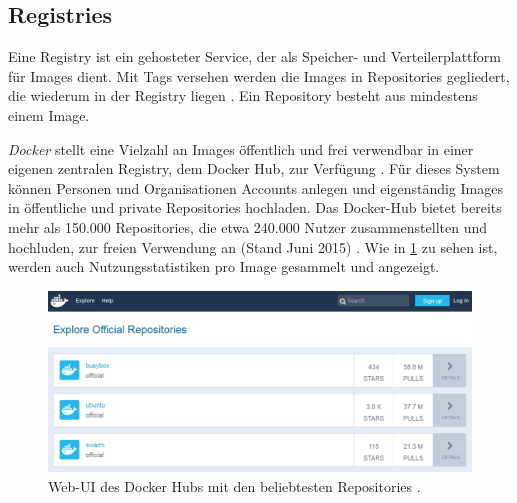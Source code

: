 \documentclass[../main.tex]{subfiles}
\begin{document}

		\subsection{Registries}
		\label{dockerRegistries}
      Eine Registry ist ein gehosteter Service, der als Speicher- und Verteilerplattform für Images dient. Mit Tags versehen werden die Images in Repositories gegliedert, die wiederum in der Registry liegen \cite{dockerRegistry}. Ein Repository besteht aus mindestens einem Image.

      \emph{Docker} stellt eine Vielzahl an Images öffentlich und frei verwendbar in einer eigenen zentralen Registry, dem Docker Hub, zur Verfügung \cite[S.11]{dockerBook}\cite[S.3]{dockerSec1}\cite{dockerRegistry}. Für dieses System können Personen und Organisationen Accounts anlegen und eigenständig Images in öffentliche und private Repositories hochladen. Das Docker-Hub bietet bereits mehr als 150.000 Repositories, die etwa 240.000 Nutzer zusammenstellten und hochluden, zur freien Verwendung an (Stand Juni 2015) \cite[S.16]{slideshareDockercon15}. Wie in \fig \ref{fig:intro_registry} zu sehen ist, werden auch Nutzungsstatistiken pro Image gesammelt und angezeigt.

      \begin{figure}[h]
          \centering
          \includegraphics[width=1.0\textwidth]{./images/intro_registry.jpg}
          \caption{Web-\acrshort{UI} des Docker Hubs mit den beliebtesten Repositories \cite{dockerHub}.}
          \label{fig:intro_registry}
      \end{figure}
\end{document}
